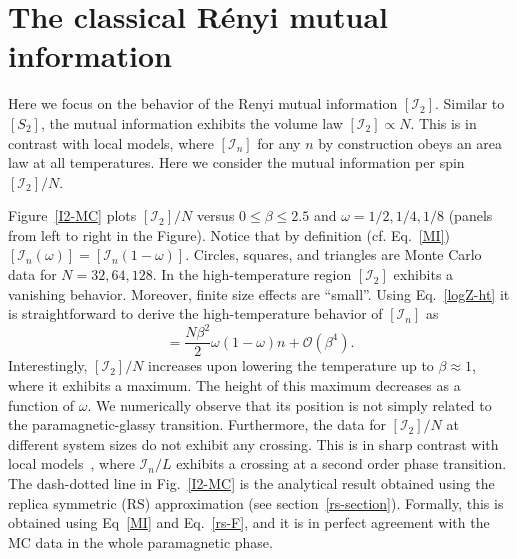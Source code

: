 \documentclass[twocolumn,superscriptaddress,prb,10pt]{revtex4-1}
\begin{document}
\section{The classical R\'enyi mutual information}
\label{I2-section}

Here we focus on the behavior of the Renyi mutual information $[{\mathcal I}_2]$. 
Similar to $[S_2]$, the mutual information exhibits the volume law $[{\mathcal I}_2]
\propto N$. This is in contrast with local models, where $[{\mathcal I}_n]$ for any 
$n$ by construction obeys an area law at all temperatures. Here we consider the 
mutual information per spin $[{\mathcal I}_2]/N$. 

Figure~\ref{I2-MC} plots $[{\mathcal I}_2]/N$ versus $0\le\beta\le 2.5$ and $\omega=1/2,1/4,
1/8$ (panels from left to right in the Figure). Notice that by definition (cf. Eq.~\eqref{MI}) 
$[{\mathcal I}_n(\omega)]=[{\mathcal I}_n(1-\omega)]$. Circles, squares, and triangles  
are Monte Carlo data for $N=32,64,128$. In the high-temperature region $[{\mathcal I}_2]$ 
exhibits a vanishing behavior. Moreover, finite size effects are ``small''. Using Eq.~\eqref{logZ-ht} 
it is straightforward to derive the high-temperature behavior of $[{\mathcal I}_n]$ as  
%
\begin{equation}
[{\mathcal I}_n]=\frac{N\beta^2}{2}\omega(1-\omega)n+{\mathcal O}
(\beta^4).
\end{equation}
%
Interestingly, $[{\mathcal I}_2]/N$ increases upon lowering the temperature 
up to $\beta\approx 1$, where it exhibits a maximum. The height of this maximum 
decreases as a function of $\omega$. We numerically observe that its position 
is not simply related to the paramagnetic-glassy transition. 
Furthermore, the 
data for $[{\mathcal I}_2]/N$ at different system sizes do not exhibit any crossing. This is 
in sharp contrast with local models~\cite{jaconis-2013}, where ${\mathcal I}_n/L$ exhibits a 
crossing at a second order phase transition. The dash-dotted line in Fig.~\ref{I2-MC} is the 
analytical result obtained using the replica symmetric (RS) approximation (see 
section~\ref{rs-section}). Formally, this is obtained using Eq~\eqref{MI} and Eq.~\eqref{rs-F}, 
and it is in perfect agreement with the MC data in the whole paramagnetic phase.  
\end{document}
